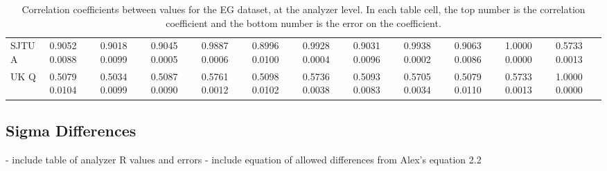 \begin{landscape}
\begin{table}
\begin{tabularx}{1\linewidth}{@{\extracolsep{\fill}}lXXXXXXXXXXX}
	SJTU A & 0.9052 0.0088 & 0.9018 0.0099 & 0.9045 0.0005 & 0.9887 0.0006 & 0.8996 0.0100 & 0.9928 0.0004 & 0.9031 0.0096 & 0.9938 0.0002 & 0.9063 0.0086 & 1.0000 0.0000 & 0.5733 0.0013  \\
	UK Q   & 0.5079 0.0104 & 0.5034 0.0099 & 0.5087 0.0090 & 0.5761 0.0012 & 0.5098 0.0102 & 0.5736 0.0038 & 0.5093 0.0083 & 0.5705 0.0034 & 0.5079 0.0110 & 0.5733 0.0013 & 1.0000 0.0000  \\
  \bottomrule
\end{tabularx}
\caption[]{Correlation coefficients between \R values for the EG dataset, at the analyzer level. In each table cell, the top number is the correlation coefficient and the bottom number is the error on the coefficient.}
\label{tab:Corrs_EG_analyzer}
\end{table}
\end{landscape}









\subsection{Sigma Differences}



- include table of analyzer R values and errors
- include equation of allowed differences from Alex's equation 2.2






